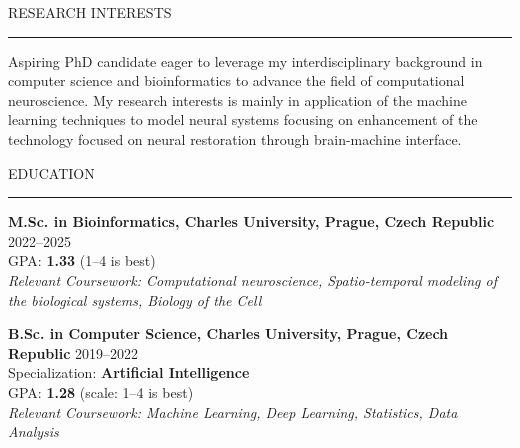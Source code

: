 \documentclass{resume} %
\renewenvironment{rSection}[1]{
\sectionskip
\textcolor{CarnegieMellonRed}{\MakeUppercase{#1}}
\sectionlineskip
\hrule
\begin{list}{}{
\setlength{\leftmargin}{1.5em}
}
\item[]
}{
\end{list}
}
\begin{document}
\begin{rSection}{Research Interests}
    Aspiring PhD candidate eager to leverage my interdisciplinary background in computer science and bioinformatics to advance the field of computational neuroscience. My research interests is mainly in application of the machine learning techniques to model neural systems focusing on enhancement of the technology focused on neural restoration through brain-machine interface.
\end{rSection}


\begin{rSection}{Education}
{\bf \large M.Sc. in Bioinformatics, Charles University, Prague, Czech Republic} \hfill {2022--2025} \\ 
GPA: \textbf{1.33} (1--4 \vline {} is best)  \hfill \\
{\em Relevant Coursework: Computational neuroscience, Spatio-temporal modeling of the biological systems, Biology of the Cell}

{\bf \large B.Sc. in Computer Science, Charles University, Prague, Czech Republic} \hfill {2019--2022} \\
Specialization: \textbf{Artificial Intelligence} \\
GPA: \textbf{1.28} (scale: 1--4 \vline {} is best) \\
{\em Relevant Coursework: Machine Learning, Deep Learning, Statistics, Data Analysis}

\end{rSection}
\end{document}
